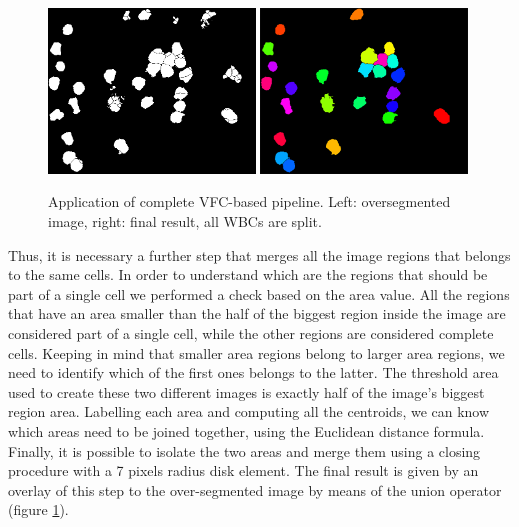 \documentclass[final,a4paper,12pt,english]{UnicaPhdThesis3}
\begin{document}
\begin{figure}[!b]
	\centering
	\includegraphics[width=0.49\textwidth]{images/2018_1_visapp/figure8.png}
	\includegraphics[width=0.49\textwidth]{images/2018_1_visapp/detection.png}
	\caption{\label{fig:vfc2}Application of complete VFC-based pipeline. Left: oversegmented image, right: final result, all WBCs are split.}
\end{figure}
Thus, it is necessary a further step that merges all the image regions that belongs to the same cells. In order to understand which are the regions that should be part of a single cell we performed a check based on the area value.
All the regions that have an area smaller than the half of the biggest region inside the image are considered part of a single cell, while the other regions are considered complete cells.
Keeping in mind that smaller area regions belong to larger area regions, we need to identify which of the first ones belongs to the latter. The threshold area used to create these two different images is exactly half of the image's biggest region area. Labelling each area and computing all the centroids, we can know which areas need to be joined together, using the Euclidean distance formula. Finally, it is possible to isolate the two areas and merge them using a closing procedure with a 7 pixels radius disk element. The final result is given by an overlay of this step to the over-segmented image by means of the union operator (figure \ref{fig:vfc2}).
\end{document}
